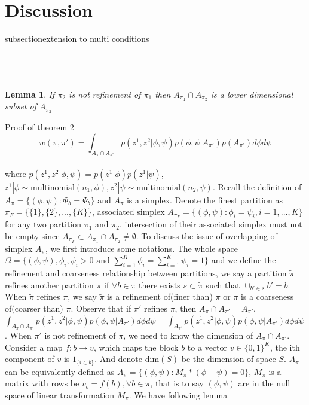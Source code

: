 \documentclass[11pt]{amsart}
\newtheorem{lemma}{Lemma}
\begin{document}
\section{Discussion}
subsection{extension to multi conditions}

\newpage
\appendix
\section{}
\hfill\\
\begin{lemma}
If $\pi_2$ is not refinement of $\pi_1$ then $A_{\pi_1} \cap A_{\pi_2}$ is a lower dimensional subset of $A_{\pi_2}$
\end{lemma}
Proof of theorem 2
\[
w(\pi, \pi') = \int_{A_\pi\cap A_{\pi'}}p(z^1,z^2|\phi,\psi)p(\phi, \psi | A_{\pi'})p(A_{\pi'})d\phi d\psi
\]
\\
where $p(z^1,z^2|\phi,\psi) = p(z^1|\phi)p(z^1|\psi)$, $z^1|\phi \sim \text{multinomial}(n_1, \phi), z^2|\psi \sim \text{multinomial}(n_2, \psi)$. Recall the definition of $A_\pi = \{(\phi,\psi): \Phi_b = \Psi_b\}$ and $A_\pi$ is a simplex. Denote the finest partition as $\pi_{F} = \{ \{1\}, \{2\},...,\{K\}\}$, associated simplex $A_{\pi_{F}} = \{(\phi, \psi): \phi_i = \psi_i, i = 1,...,K\}$ for any two partition $\pi_1$ and $\pi_2$, intersection of their associated simplex must not be empty since $A_{\pi_{F}}\subset A_{\pi_1}\cap A_{\pi_2} \neq \emptyset$.  To discuss the issue of overlapping of simplex $A_\pi$, we first introduce some notations. The whole space $\Omega = \{ (\phi,\psi), \phi_i,\psi_i > 0 \text{ and } \sum_{i=1}^K \phi_i = \sum_{i=1}^K \psi_i = 1\}$ and we define the refinement and coarseness relationship between partitions, we say a partition $\tilde{\pi}$ refines another partition $\pi$ if $\forall b \in \pi$ there exists $s \subset \tilde{\pi}$  such that $\cup_{b'\in s} b' = b$. When $\tilde{\pi}$ refines $\pi$, we say $\tilde{\pi}$ is a refinement of(finer than) $\pi$ or $\pi$ is a coarseness of(coarser than) $\tilde{\pi}$. 
Observe that if $\pi'$ refines $\pi$, then $A_\pi \cap A_{\pi'} = A_{\pi'}$, $\int_{A_\pi\cap A_{\pi'}} p(z^1,z^2|\phi,\psi)p(\phi, \psi | A_{\pi'})d\phi d\psi = \int_{A_{\pi'}} p(z^1,z^2|\phi,\psi)p(\phi, \psi | A_{\pi'})d\phi d\psi $. When $\pi'$ is not refinement of $\pi$, we need to know the dimension of $A_\pi\cap A_{\pi'}$. Consider a map $f: b \rightarrow v$, which maps the block $b$ to a vector $v\in \{0, 1\}^K$, the ith component of $v$ is $1_{\{i\in b\}}$. And denote $\text{dim}(S)$ be the dimension of space $S$. $A_\pi$ can be equivalently defined as $A_\pi =  \{(\phi,\psi): M_\pi * (\phi - \psi) = 0\}$, $M_\pi$ is a matrix with rows be $v_b = f(b), \forall b\in \pi$, that is to say $(\phi,\psi)$ are in the null space of linear transformation $M_\pi$.  We have following lemma\\
\end{document}
